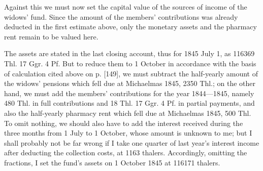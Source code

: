\noindent\hspace*{\parindent}Against this we must now set the capital value of the sources of income of the widows' fund. Since the amount of the members' contributions was already deducted in the first estimate above, only the monetary assets and the pharmacy rent remain to be valued here.

The assets are stated in the last closing account, thus for 1845 July 1, as 116369 Thl. 17 Ggr. 4 Pf. But to reduce them to 1 October in accordance with the basis of calculation cited above on p. [149], we must subtract the half-yearly amount of the widows' pensions which fell due at Michaelmas 1845, 2350 Thl.; on the other hand, we must add the members' contributions for the year 1844—1845, namely 480 Thl. in full contributions and 18 Thl. 17 Ggr. 4 Pf. in partial payments, and also the half-yearly pharmacy rent which fell due at Michaelmas 1845, 500 Thl. To omit nothing, we should also have to add the interest received during the three months from 1 July to 1 October, whose amount is unknown to me; but I shall probably not be far wrong if I take one quarter of last year's interest income after deducting the collection costs, at 1163 thalers. Accordingly, omitting the fractions, I set the fund's assets on 1 October 1845 at 116171 thalers.

